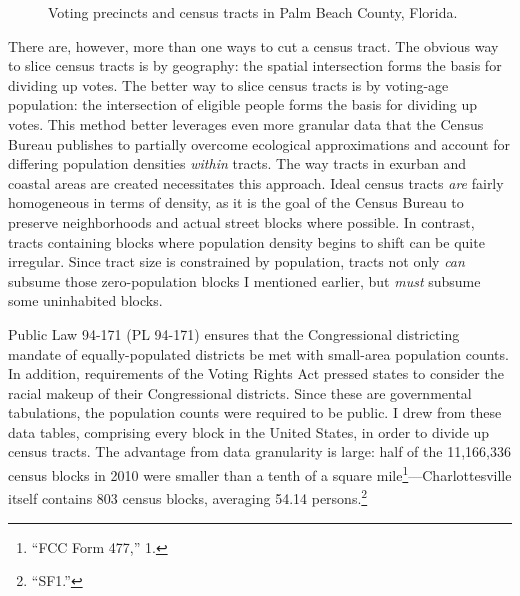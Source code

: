 \documentclass[
]{article}
\begin{document}
\begin{figure}

{\centering {}

}

\caption{Voting precincts and census tracts in Palm Beach County, Florida.}\label{fig:palmbeach}
\end{figure}

There are, however, more than one ways to cut a census tract.
The obvious way to slice census tracts is by geography: the spatial intersection forms the basis for dividing up votes.
The better way to slice census tracts is by voting-age population: the intersection of eligible people forms the basis for dividing up votes.
This method better leverages even more granular data that the Census Bureau publishes to partially overcome ecological approximations and account for differing population densities \emph{within} tracts.
The way tracts in exurban and coastal areas are created necessitates this approach.
Ideal census tracts \emph{are} fairly homogeneous in terms of density, as it is the goal of the Census Bureau to preserve neighborhoods and actual street blocks where possible.
In contrast, tracts containing blocks where population density begins to shift can be quite irregular.
Since tract size is constrained by population, tracts not only \emph{can} subsume those zero-population blocks I mentioned earlier, but \emph{must} subsume some uninhabited blocks.

Public Law 94-171 (PL 94-171) ensures that the Congressional districting mandate of equally-populated districts be met with small-area population counts.
In addition, requirements of the Voting Rights Act pressed states to consider the racial makeup of their Congressional districts.
Since these are governmental tabulations, the population counts were required to be public.
I drew from these data tables, comprising every block in the United States, in order to divide up census tracts.
The advantage from data granularity is large: half of the 11,166,336 census blocks in 2010 were smaller than a tenth of a square mile\footnote{``FCC Form 477,'' 1.}---Charlottesville itself contains 803 census blocks, averaging 54.14 persons.\footnote{``SF1.''}
\end{document}
